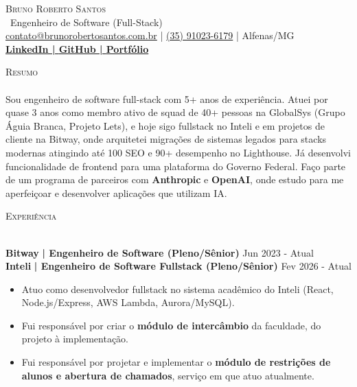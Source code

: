\documentclass[a4paper]{article}
\newcommand{\lineunder}{
    \vspace*{-8pt} \\
    \hspace*{-18pt} \hrulefill \\
}
\newcommand{\header}[1]{
    {\hspace*{-18pt}\vspace*{6pt} \textsc{#1}}
    \vspace*{-6pt} \lineunder
}
\begin{document}
    \vspace*{-40pt}

    \vspace*{-2pt}
    \begin{center}
        {\Huge \scshape {Bruno Roberto Santos}}\\
        \vspace*{2pt}
        \ {Engenheiro de Software (Full-Stack)}\\
        \vspace*{2pt}
        \href{mailto:contato@brunorobertosantos.com.br}{contato@brunorobertosantos.com.br} | \href{tel:+5535910236179}{(35) 91023-6179} | Alfenas/MG\\
        \vspace*{4pt}
        \textbf{\href{https://www.linkedin.com/in/rsbruno/}{LinkedIn | }}\textbf{\href{https://github.com/rsbruno}{GitHub | }}\textbf{\href{https://brunorobertosantos.com.br/}{Portf\'olio}}\\
    \end{center}

    \header{Resumo}
    \vspace{2mm}
Sou engenheiro de software full-stack com 5+ anos de experi\^encia. Atuei por quase 3 anos como membro ativo de squad de 40+ pessoas na GlobalSys (Grupo \'Aguia Branca, Projeto Lets), e hoje sigo fullstack no Inteli e em projetos de cliente na Bitway, onde arquitetei migra\c{c}\~oes de sistemas legados para stacks modernas atingindo at\'e 100 SEO e 90+ desempenho no Lighthouse. Já desenvolvi funcionalidade de frontend para uma plataforma do Governo Federal. Fa\c{c}o parte de um programa de parceiros com \textbf{Anthropic} e \textbf{OpenAI}, onde estudo para me aperfei\c{c}oar e desenvolver aplica\c{c}\~oes que utilizam IA.
    \vspace{2mm}

    \header{Experi\^encia}
    \vspace{2mm}

    \textbf{Bitway}\textbf{ | Engenheiro de Software (Pleno/S\^enior)} \hfill  Jun 2023 - Atual\\
    \textbf{Inteli}\textbf{ | Engenheiro de Software Fullstack (Pleno/S\^enior)} \hfill  Fev 2026 - Atual\\
    \vspace{-3mm}
    \begin{itemize} \itemsep -3pt
        \item Atuo como desenvolvedor fullstack no sistema acad\^emico do Inteli (React, Node.js/Express, AWS Lambda, Aurora/MySQL).
        \item Fui respons\'avel por criar o \textbf{m\'odulo de interc\^ambio} da faculdade, do projeto \`a implementa\c{c}\~ao.
        \item Fui respons\'avel por projetar e implementar o \textbf{m\'odulo de restri\c{c}\~oes de alunos e abertura de chamados}, servi\c{c}o em que atuo atualmente.
    \end{itemize}
\end{document}
